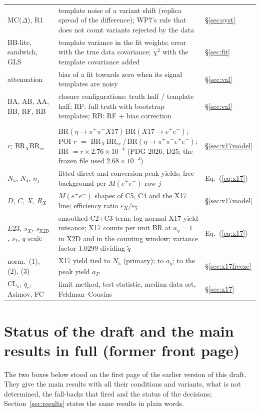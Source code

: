 \documentclass[11pt,a4paper]{article}
\newcommand{\ee}{\ensuremath{e^{+}e^{-}}\xspace}
\newcommand{\pipi}{\ensuremath{\pi^{+}\pi^{-}}\xspace}
\newcommand{\ppee}{\ensuremath{\pi^{+}\pi^{-}e^{+}e^{-}}\xspace}
\newcommand{\Mee}{\ensuremath{M(e^{+}e^{-})}\xspace}
\newcommand{\aEta}{\ensuremath{a_\eta}\xspace}
\newcommand{\aP}{\ensuremath{a_P}\xspace}
\begin{document}
{\begin{longtable}{@{}>{\raggedright\arraybackslash}p{3.0cm} >{\raggedright\arraybackslash}p{\dimexpr\textwidth-3.0cm-2.0cm-4\tabcolsep\relax} >{\raggedright\arraybackslash}p{2.0cm}@{}}
MC($\Delta$), R1 & template noise of a variant shift (replica spread of the difference); WP7's rule that does not count variants rejected by the data & \S\ref{sec:syst} \\
BB-lite, sandwich, GLS & template variance in the fit weights; error with the true data covariance; $\chi^2$ with the template covariance added & \S\ref{sec:fit} \\
attenuation & bias of a fit towards zero when its signal templates are noisy & \S\ref{sec:val} \\
BA, AB, AA, BB, RF, RB & closure configurations: truth half / template half; RF: full truth with bootstrap templates; RB: RF + bias correction & \S\ref{sec:val} \\
\midrule
\multicolumn{3}{@{}l}{\textbf{X17}} \\
$r$; BR$_X$BR$_{ee}$ & BR$(\eta\to\pipi X17)\,$BR$(X17\to\ee)$; POI $r$ $=$ BR$_X$\,BR$_{ee}$\,/\,BR$(\eta\to\ppee)$; BR $=r\times2.76\times10^{-4}$ (PDG 2026, D25; the frozen file used $2.68\times10^{-4}$) & \S\ref{sec:x17model} \\
$N_5$, $N_4$, $n_j$ & fitted direct and conversion peak yields; free background per \Mee row $j$ & Eq.~(\ref{eq:x17}) \\
$D$, $C$, $X$, $R_X$ & \Mee shapes of C5, C4 and the X17 line; efficiency ratio $\varepsilon_X/\varepsilon_5$ & \S\ref{sec:x17model} \\
$E23$, $s_X$, $s_{\mathrm{X2D}}$, $s_1$, $q$-scale & smoothed C2+C3 term; log-normal X17 yield nuisance; X17 counts per unit BR at $\aEta=1$ in X2D and in the counting window; variance factor 1.0299 dividing $\tilde q$ & Eq.~(\ref{eq:x17}) \\
norm.\ (1), (2), (3) & X17 yield tied to $N_5$ (primary); to \aEta; to the peak yield \aP & \S\ref{sec:x17freeze} \\
CL$_s$, $\tilde q_r$, Asimov, FC & limit method, test statistic, median data set, Feldman--Cousins & \S\ref{sec:x17} \\
\end{longtable}
}

\section{Status of the draft and the main results in full (former front page)}
\label{app:status}
The two boxes below stood on the first page of the earlier version of this draft. They give the main results with all their conditions and variants, what is not determined, the fall-backs that fired and the status of the decisions; Section~\ref{sec:results} states the same results in plain words.
\end{document}
